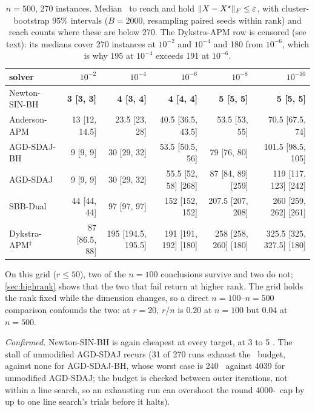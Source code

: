 \begin{table}[t]
\centering
\caption{$n=500$, 270 instances. Median \EVDs\ to reach and hold
$\lVert X-X^\star\rVert_F\le\varepsilon$, with cluster-bootstrap 95\% intervals
($B=2000$, resampling paired seeds within rank) and reach counts where these
are below 270. The Dykstra-APM row is censored (see text): its medians cover
270 instances at $10^{-2}$ and $10^{-4}$ and 180 from $10^{-6}$, which is why
195 at $10^{-4}$ exceeds 191 at $10^{-6}$.}
\label{tab:n500}
\footnotesize
\setlength{\tabcolsep}{3pt}
\begin{tabular}{lrrrrr}
\toprule
solver & $10^{-2}$ & $10^{-4}$ & $10^{-6}$ & $10^{-8}$ & $10^{-10}$\\
\midrule
Newton-SIN-BH & \textbf{3 [3, 3]} & \textbf{4 [3, 4]} & \textbf{4 [4, 4]} & \textbf{5 [5, 5]} & \textbf{5 [5, 5]}\\
Anderson-APM & 13 [12, 14.5] & 23.5 [23, 28] & 40.5 [36.5, 43.5] & 53.5 [53, 55] & 70.5 [67.5, 74]\\
AGD-SDAJ-BH & 9 [9, 9] & 30 [29, 32] & 53.5 [50.5, 56] & 79 [76, 80] & 101.5 [98.5, 105]\\
AGD-SDAJ & 9 [9, 9] & 30 [29, 32] & 55.5 [52, 58] \tiny[268] & 87 [84, 89] \tiny[259] & 119 [117, 123] \tiny[242]\\
SBB-Dual & 44 [44, 44] & 97 [97, 97] & 152 [152, 152] & 207.5 [207, 208] & 260 [259, 262] \tiny[261]\\
Dykstra-APM$^{\ddagger}$ & 87 [86.5, 88] & 195 [194.5, 195.5] & 191 [191, 192] \tiny[180] & 258 [258, 260] \tiny[180] & 325.5 [325, 327.5] \tiny[180]\\
\bottomrule
\end{tabular}
\end{table}

On this grid ($r\le50$), two of the $n=100$ conclusions survive and two do
not; \cref{sec:highrank} shows that the two that fail return at higher rank.
The grid holds the rank fixed while the dimension changes, so a direct
$n=100$--$n=500$ comparison confounds the two: at $r=20$, $r/n$ is $0.20$ at
$n=100$ but $0.04$ at $n=500$.

\emph{Confirmed.} Newton-SIN-BH is again cheapest at every target, at 3 to 5
\EVDs.
The stall of unmodified AGD-SDAJ recurs (31 of 270 runs exhaust the \EVD\
budget, against none for AGD-SDAJ-BH, whose worst case is 240 \EVDs\ against
4039 for unmodified AGD-SDAJ; the budget is checked between outer iterations,
not within a line search, so an exhausting run can overshoot the round
4000-\EVD\ cap by up to one line search's trials before it halts).

